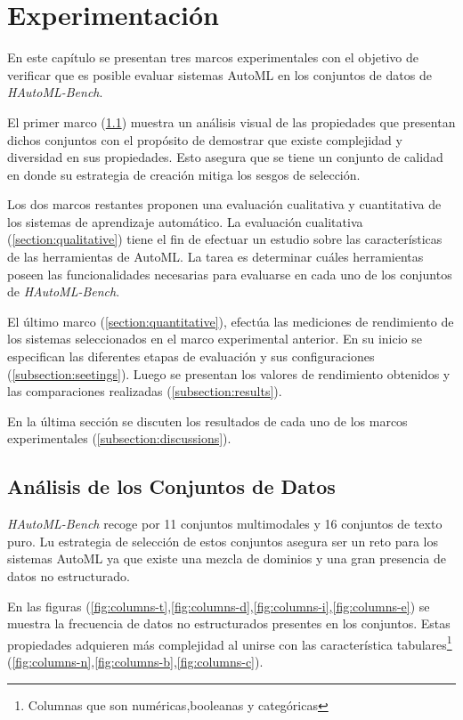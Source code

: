 \chapter{Experimentación}\label{chapter:experiments}

En este capítulo se presentan tres marcos experimentales con el objetivo de verificar que es posible evaluar sistemas AutoML en los conjuntos de datos de 
\textit{HAutoML-Bench}. 

El primer marco (\ref{section:data}) muestra un análisis visual de las propiedades que presentan dichos conjuntos con el propósito de demostrar que existe complejidad y 
diversidad en sus propiedades. Esto asegura que se tiene un conjunto de calidad en donde su estrategia de creación mitiga los sesgos de 
selección.

Los dos marcos restantes proponen una evaluación cualitativa y cuantitativa de los sistemas de aprendizaje automático.
La evaluación cualitativa (\ref{section:qualitative}) tiene el fin de efectuar un estudio sobre las características de las herramientas de AutoML. La tarea es determinar 
cuáles herramientas poseen las funcionalidades necesarias para evaluarse en cada uno de los conjuntos de \textit{HAutoML-Bench}.

El último marco (\ref{section:quantitative}), efectúa las mediciones de rendimiento de los sistemas seleccionados en el marco experimental anterior. En su inicio 
se especifican las diferentes etapas de evaluación y sus configuraciones (\ref{subsection:seetings}). Luego se presentan los valores de 
rendimiento obtenidos y las comparaciones realizadas (\ref{subsection:results}).

En la última sección se discuten los resultados de cada uno de los marcos experimentales (\ref{subsection:discussions}).  

\section{Análisis de los Conjuntos de Datos}\label{section:data}

\textit{HAutoML-Bench} recoge por 11 conjuntos multimodales y 16 conjuntos de texto puro.
Lu estrategia de selección de estos conjuntos asegura ser un reto para los sistemas AutoML ya que existe una mezcla de dominios y una gran presencia de datos no 
estructurado.

En las figuras (\ref{fig:columns-t},\ref{fig:columns-d},\ref{fig:columns-i},\ref{fig:columns-e}) se muestra la frecuencia de datos no estructurados presentes en los conjuntos. 
Estas propiedades adquieren más complejidad al unirse con las característica tabulares\footnote{Columnas que son numéricas,booleanas y categóricas} 
(\ref{fig:columns-n},\ref{fig:columns-b},\ref{fig:columns-c}).

